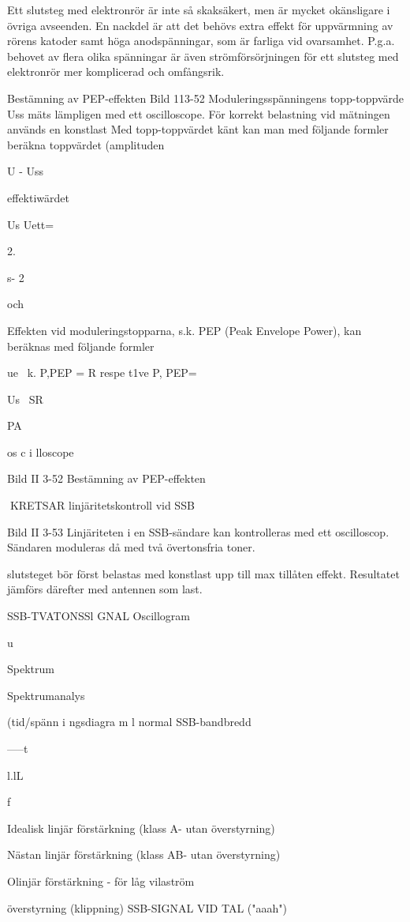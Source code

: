 {{Ett slutsteg med elektronrör är inte så
skaksäkert, men är mycket okänsligare i
övriga avseenden. En nackdel är att det
behövs extra effekt för uppvärmning av rörens katoder samt höga anodspänningar,
som är farliga vid ovarsamhet. P.g.a. behovet av flera olika spänningar är även strömförsörjningen för ett slutsteg med elektronrör
mer komplicerad och omfångsrik.

Bestämning av PEP-effekten
Bild 113-52
Moduleringsspänningens topp-toppvärde
Uss mäts lämpligen med ett oscilloscope.
För korrekt belastning vid mätningen används en konstlast
Med topp-toppvärdet känt kan man med
följande formler beräkna
toppvärdet (amplituden

U - Uss

effektiwärdet

Us
Uett= {2.

s- 2

och

Effekten vid moduleringstopparna, s.k.
PEP (Peak Envelope Power), kan beräknas
med följande formler

ue~
k.
P,PEP =
R respe t1ve
P,
PEP=

Us~
SR

PA

os c i lloscope

Bild II 3-52 Bestämning av PEP-effekten

KRETSAR
linjäritetskontroll vid SSB

Bild II 3-53
Linjäriteten i en SSB-sändare kan kontrolleras med ett oscilloscop. Sändaren moduleras då med två övertonsfria toner.

slutsteget bör först belastas med konstlast
upp till max tillåten effekt. Resultatet jämförs
därefter med antennen som last.

SSB-TVATONSSl GNAL
Oscillogram

u

Spektrum

Spektrumanalys

(tid/spänn i ngsdiagra m l
normal SSB-bandbredd

-----t

l.lL 

f

Idealisk linjär förstärkning (klass A- utan överstyrning)

Nästan linjär förstärkning (klass AB- utan överstyrning)

Olinjär förstärkning - för låg vilaström

överstyrning (klippning)
SSB-SIGNAL VID TAL ("aaah")

}}}
